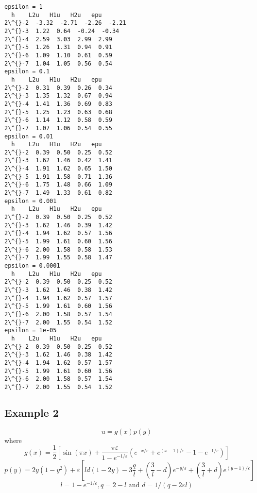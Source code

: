 \documentclass[11pt]{article}
\begin{document}
    \begin{Verbatim}[commandchars=\\\{\}]
epsilon = 1
  h    L2u   H1u   H2u   epu
2\^{}-2  -3.32  -2.71  -2.26  -2.21
2\^{}-3  1.22  0.64  -0.24  -0.34
2\^{}-4  2.59  3.03  2.99  2.99
2\^{}-5  1.26  1.31  0.94  0.91
2\^{}-6  1.09  1.10  0.61  0.59
2\^{}-7  1.04  1.05  0.56  0.54
epsilon = 0.1
  h    L2u   H1u   H2u   epu
2\^{}-2  0.31  0.39  0.26  0.34
2\^{}-3  1.35  1.32  0.67  0.94
2\^{}-4  1.41  1.36  0.69  0.83
2\^{}-5  1.25  1.23  0.63  0.68
2\^{}-6  1.14  1.12  0.58  0.59
2\^{}-7  1.07  1.06  0.54  0.55
epsilon = 0.01
  h    L2u   H1u   H2u   epu
2\^{}-2  0.39  0.50  0.25  0.52
2\^{}-3  1.62  1.46  0.42  1.41
2\^{}-4  1.91  1.62  0.65  1.50
2\^{}-5  1.91  1.58  0.71  1.36
2\^{}-6  1.75  1.48  0.66  1.09
2\^{}-7  1.49  1.33  0.61  0.82
epsilon = 0.001
  h    L2u   H1u   H2u   epu
2\^{}-2  0.39  0.50  0.25  0.52
2\^{}-3  1.62  1.46  0.39  1.42
2\^{}-4  1.94  1.62  0.57  1.56
2\^{}-5  1.99  1.61  0.60  1.56
2\^{}-6  2.00  1.58  0.58  1.53
2\^{}-7  1.99  1.55  0.58  1.47
epsilon = 0.0001
  h    L2u   H1u   H2u   epu
2\^{}-2  0.39  0.50  0.25  0.52
2\^{}-3  1.62  1.46  0.38  1.42
2\^{}-4  1.94  1.62  0.57  1.57
2\^{}-5  1.99  1.61  0.60  1.56
2\^{}-6  2.00  1.58  0.57  1.54
2\^{}-7  2.00  1.55  0.54  1.52
epsilon = 1e-05
  h    L2u   H1u   H2u   epu
2\^{}-2  0.39  0.50  0.25  0.52
2\^{}-3  1.62  1.46  0.38  1.42
2\^{}-4  1.94  1.62  0.57  1.57
2\^{}-5  1.99  1.61  0.60  1.56
2\^{}-6  2.00  1.58  0.57  1.54
2\^{}-7  2.00  1.55  0.54  1.52
    \end{Verbatim}

    \subsection{Example 2}\label{example-2}

    \[
u=g(x)p(y)
\] where \[
g(x)=\frac{1}{2}\left[\sin (\pi x)+\frac{\pi \varepsilon}{1-e^{-1 / \varepsilon}}\left(e^{-x / \varepsilon}+e^{(x-1) / \varepsilon}-1-e^{-1 / \varepsilon}\right)\right]
\] \[
p(y)=2 y\left(1-y^{2}\right)+\varepsilon\left[l d(1-2 y)-3 \frac{q}{l}+\left(\frac{3}{l}-d\right) e^{-y / \varepsilon}+\left(\frac{3}{l}+d\right) e^{(y-1) / \varepsilon}\right]
\] \[
l=1-e^{-1 / \varepsilon}, q=2-l \text { and } d=1 /(q-2 \varepsilon l)
\]
\end{document}
